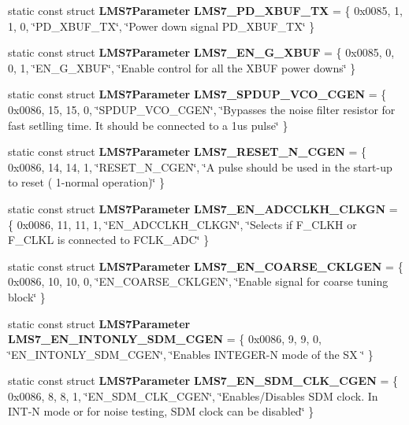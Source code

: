 \begin{DoxyCompactItemize}
\item 
static const struct {\bf L\+M\+S7\+Parameter} {\bf L\+M\+S7\+\_\+\+P\+D\+\_\+\+X\+B\+U\+F\+\_\+\+TX} = \{ 0x0085, 1, 1, 0, \char`\"{}\+P\+D\+\_\+\+X\+B\+U\+F\+\_\+\+T\+X\char`\"{}, \char`\"{}\+Power down signal P\+D\+\_\+\+X\+B\+U\+F\+\_\+\+T\+X\char`\"{} \}
\item 
static const struct {\bf L\+M\+S7\+Parameter} {\bf L\+M\+S7\+\_\+\+E\+N\+\_\+\+G\+\_\+\+X\+B\+UF} = \{ 0x0085, 0, 0, 1, \char`\"{}\+E\+N\+\_\+\+G\+\_\+\+X\+B\+U\+F\char`\"{}, \char`\"{}\+Enable control for all the X\+B\+U\+F power downs\char`\"{} \}
\item 
static const struct {\bf L\+M\+S7\+Parameter} {\bf L\+M\+S7\+\_\+\+S\+P\+D\+U\+P\+\_\+\+V\+C\+O\+\_\+\+C\+G\+EN} = \{ 0x0086, 15, 15, 0, \char`\"{}\+S\+P\+D\+U\+P\+\_\+\+V\+C\+O\+\_\+\+C\+G\+E\+N\char`\"{}, \char`\"{}\+Bypasses the noise filter resistor for fast setlling time. It should be connected to a 1us pulse\char`\"{} \}
\item 
static const struct {\bf L\+M\+S7\+Parameter} {\bf L\+M\+S7\+\_\+\+R\+E\+S\+E\+T\+\_\+\+N\+\_\+\+C\+G\+EN} = \{ 0x0086, 14, 14, 1, \char`\"{}\+R\+E\+S\+E\+T\+\_\+\+N\+\_\+\+C\+G\+E\+N\char`\"{}, \char`\"{}\+A pulse should be used in the start-\/up to reset ( 1-\/normal operation)\char`\"{} \}
\item 
static const struct {\bf L\+M\+S7\+Parameter} {\bf L\+M\+S7\+\_\+\+E\+N\+\_\+\+A\+D\+C\+C\+L\+K\+H\+\_\+\+C\+L\+K\+GN} = \{ 0x0086, 11, 11, 1, \char`\"{}\+E\+N\+\_\+\+A\+D\+C\+C\+L\+K\+H\+\_\+\+C\+L\+K\+G\+N\char`\"{}, \char`\"{}\+Selects if F\+\_\+\+C\+L\+K\+H or F\+\_\+\+C\+L\+K\+L is connected to F\+C\+L\+K\+\_\+\+A\+D\+C\char`\"{} \}
\item 
static const struct {\bf L\+M\+S7\+Parameter} {\bf L\+M\+S7\+\_\+\+E\+N\+\_\+\+C\+O\+A\+R\+S\+E\+\_\+\+C\+K\+L\+G\+EN} = \{ 0x0086, 10, 10, 0, \char`\"{}\+E\+N\+\_\+\+C\+O\+A\+R\+S\+E\+\_\+\+C\+K\+L\+G\+E\+N\char`\"{}, \char`\"{}\+Enable signal for coarse tuning block\char`\"{} \}
\item 
static const struct {\bf L\+M\+S7\+Parameter} {\bf L\+M\+S7\+\_\+\+E\+N\+\_\+\+I\+N\+T\+O\+N\+L\+Y\+\_\+\+S\+D\+M\+\_\+\+C\+G\+EN} = \{ 0x0086, 9, 9, 0, \char`\"{}\+E\+N\+\_\+\+I\+N\+T\+O\+N\+L\+Y\+\_\+\+S\+D\+M\+\_\+\+C\+G\+E\+N\char`\"{}, \char`\"{}\+Enables I\+N\+T\+E\+G\+E\+R-\/\+N mode of the S\+X \char`\"{} \}
\item 
static const struct {\bf L\+M\+S7\+Parameter} {\bf L\+M\+S7\+\_\+\+E\+N\+\_\+\+S\+D\+M\+\_\+\+C\+L\+K\+\_\+\+C\+G\+EN} = \{ 0x0086, 8, 8, 1, \char`\"{}\+E\+N\+\_\+\+S\+D\+M\+\_\+\+C\+L\+K\+\_\+\+C\+G\+E\+N\char`\"{}, \char`\"{}\+Enables/\+Disables S\+D\+M clock. In I\+N\+T-\/\+N mode or for noise testing, S\+D\+M clock can be disabled\char`\"{} \}

\end{DoxyCompactItemize}

